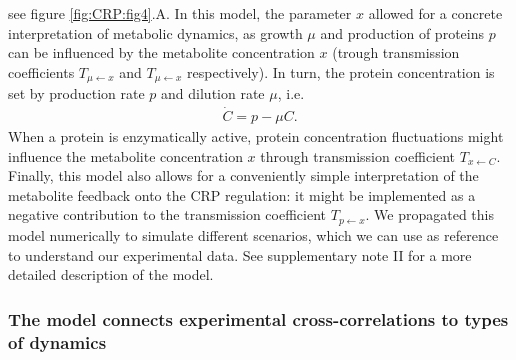 see figure \ref{fig:CRP:fig4}.A.
%
In this model, the parameter $x$ allowed for a
concrete interpretation of metabolic dynamics,
as growth $\mu$ and production of proteins $p$ can be influenced by the metabolite concentration $x$ (trough transmission coefficients $T_{{\mu}\leftarrow{x}}$ and $T_{{\mu}\leftarrow{x}}$ respectively).
%
In turn, the protein concentration is set by production rate $p$ and dilution rate $\mu$, i.e. 
\begin{align*}
\dot{C} = p - \mu C
.
\end{align*}
When a protein is enzymatically active, protein concentration fluctuations might influence the metabolite concentration $x$ through transmission coefficient $T_{{x}\leftarrow{C}}$.
%
Finally, this model also allows for a conveniently simple interpretation of the metabolite feedback onto the CRP regulation:
it might be implemented as a negative contribution to the transmission coefficient $T_{{p}\leftarrow{x}}$.
%
We propagated this model numerically to simulate different scenarios, which we can use as reference to understand our experimental data.
%
See supplementary note II for a more detailed description of the model.

\subsubsection*{The model connects experimental cross-correlations to types of dynamics}

